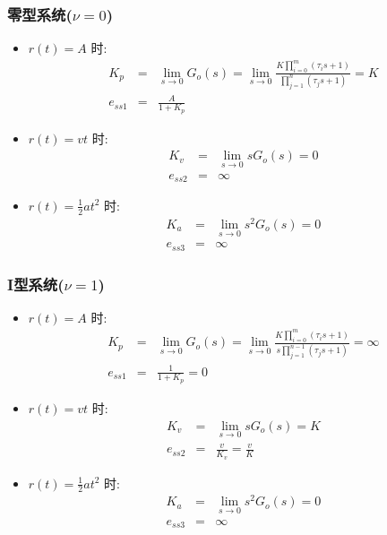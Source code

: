 \documentclass{beamer}
\begin{document}
\begin{frame}
\frametitle{零型系统($\nu=0$)}
\label{sec-2-6}

\begin{itemize}
\item <2-> $r(t)=A$ 时:
     \begin{eqnarray*}
     K_p &=& \lim_{s\rightarrow 0}G_o(s) 
         = \lim_{s\rightarrow 0}\frac{K\prod_{i=0}^m(\tau_i s+1)}{\prod_{j=1}^n (\tau_j s+1)} 
         = K \\
     e_{ss1} &=& \frac{A}{1+K_p}
     \end{eqnarray*}
\item <3-> $r(t)=vt$ 时:
     \begin{eqnarray*}
     K_v &=& \lim_{s\rightarrow 0}sG_o(s) 
         = 0 \\
     e_{ss2} &=& \infty 
     \end{eqnarray*}
\item <4> $r(t)=\frac{1}{2}at^2$ 时:
     \begin{eqnarray*}
     K_a &=& \lim_{s\rightarrow 0}s^2 G_o(s) 
         = 0 \\
     e_{ss3} &=& \infty
     \end{eqnarray*}
\end{itemize}
\end{frame}
\begin{frame}
\frametitle{I型系统($\nu=1$)}
\label{sec-2-7}

\begin{itemize}
\item <2->$r(t)=A$ 时:
     \begin{eqnarray*}
     K_p &=& \lim_{s\rightarrow 0}G_o(s) 
         = \lim_{s\rightarrow 0}\frac{K\prod_{i=0}^m(\tau_i s+1)}{s\prod_{j=1}^{n-1}(\tau_j s+1)} 
         = \infty \\
     e_{ss1} &=& \frac{1}{1+K_p}
           = 0
     \end{eqnarray*}
\item <3->$r(t)=vt$ 时:
     \begin{eqnarray*}
     K_v &=& \lim_{s\rightarrow 0}sG_o(s) 
         = K \\
     e_{ss2} &=& \frac{v}{K_v} 
             =\frac{v}{K}
     \end{eqnarray*}
\item <4->$r(t)=\frac{1}{2}at^2$ 时:
     \begin{eqnarray*}
     K_a &=& \lim_{s\rightarrow 0}s^2 G_o(s) 
         = 0 \\
     e_{ss3} &=& \infty
     \end{eqnarray*}
\end{itemize}
\end{frame}
\end{document}
